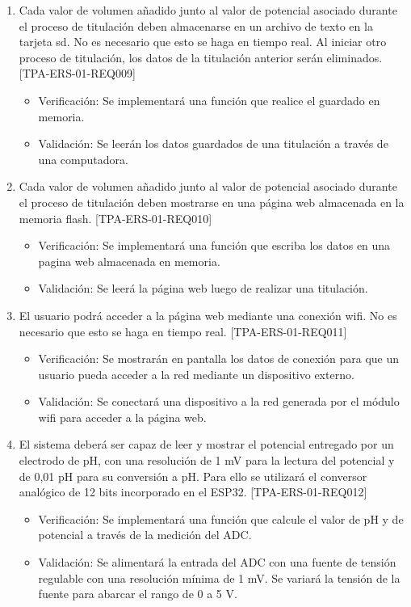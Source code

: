 \documentclass[11pt]{charter}
\begin{document}
\begin{enumerate}
\begin{enumerate}
	\item Cada valor de volumen añadido junto al valor de potencial asociado durante el proceso de titulación deben almacenarse en un archivo de texto en la tarjeta sd. No es necesario que esto se haga en tiempo real. Al iniciar otro proceso de titulación, los datos de la titulación anterior serán eliminados. [TPA-ERS-01-REQ009]
	\begin{itemize}
\item Verificación: Se implementará una función que realice el guardado en memoria.\\
\item Validación: Se leerán los datos guardados de una titulación a través de una computadora.\\
\end{itemize}

	\item Cada valor de volumen añadido junto al valor de potencial asociado durante el proceso de titulación deben mostrarse en una página web almacenada en la memoria flash. [TPA-ERS-01-REQ010]
	\begin{itemize}
\item Verificación: Se implementará una función que escriba los datos en una pagina web almacenada en memoria.\\
\item Validación: Se leerá la página web luego de realizar una titulación.\\
\end{itemize}

	\item El usuario podrá acceder a la página web mediante una conexión wifi. No es necesario que esto se haga en tiempo real. [TPA-ERS-01-REQ011]
	\begin{itemize}
\item Verificación: Se mostrarán en pantalla los datos de conexión para que un usuario pueda acceder a la red mediante un dispositivo externo.\\
\item Validación: Se conectará una dispositivo a la red generada por el módulo wifi para acceder a la página web.\\
\end{itemize}

	\item El sistema deberá ser capaz de leer y mostrar el potencial entregado por un electrodo de pH, con una resolución de 1 mV para la lectura del potencial y de 0,01 pH para su conversión a pH. Para ello se utilizará el conversor analógico de 12 bits incorporado en el ESP32. [TPA-ERS-01-REQ012]
	\begin{itemize}
\item Verificación: Se implementará una función que calcule el valor de pH y de potencial a través de la medición del ADC.\\
\item Validación: Se alimentará la entrada del ADC con una fuente de tensión regulable con una resolución mínima de 1 mV. Se variará la tensión de la fuente para abarcar el rango de 0 a 5 V.\\
\end{itemize}


\end{enumerate}
\end{enumerate}
\end{document}
